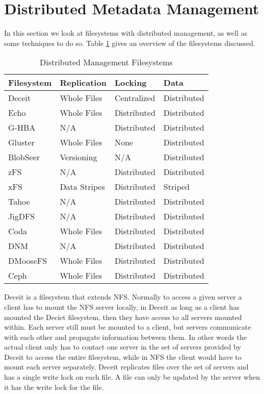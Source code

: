 \section{Distributed Metadata Management}


In this section we look at filesystems with distributed management, as well as some techniques to do so. Table \ref{tab:distributed} gives an overview of the filesystems discussed.


\begin{table}
\centering
\begin{tabular}[h]{l|l|l|l}

\textbf{Filesystem} & \textbf{Replication} & \textbf{Locking} & \textbf{Data} \\
\hline
Deceit & Whole Files & Centralized & Distributed \\
Echo & Whole Files & Distributed & Distributed \\
G-HBA & N/A & Distributed & Distributed \\
Gluster & Whole Files & None & Distributed \\
BlobSeer & Versioning & N/A & Distributed \\
zFS & N/A & Distributed & Distributed \\
xFS & Data Stripes & Distributed & Striped \\
Tahoe & N/A & Distributed & Distributed \\
JigDFS & N/A & Distributed & Distributed \\
Coda & Whole Files & Distributed & Distributed \\
DNM & N/A & Distributed & Distributed \\
DMooseFS & Whole Files & Distributed & Distributed \\
Ceph & Whole Files & Distributed & Distributed \\

\end{tabular}
\caption{Distributed Management Filesystems}
\label{tab:distributed}
\end{table}



Deceit \cite{Siegel1990} is a filesystem that extends NFS. Normally to access
a given server a client has to mount the NFS server locally, in Deceit as long
as a client has mounted the Deciet filesystem, then they have access to all
servers mounted within. Each server still must be mounted to a client, but
servers communicate with each other and propagate information between them. In
other words the actual client only has to contact one server in the set of
servers provided by Deceit to access the entire filesystem, while in NFS the
client would have to mount each server separately. Deceit replicates files
over the set of servers and has a single write lock on each file. A file can
only be updated by the server when it has the write lock for the file.


